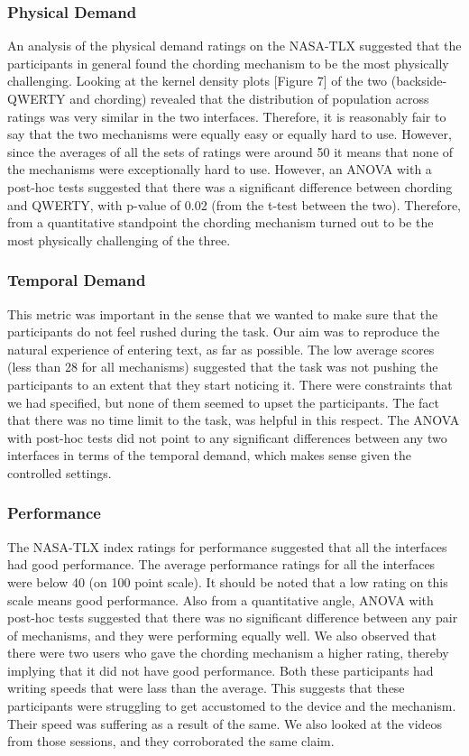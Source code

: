 \subsubsection{Physical Demand}

An analysis of the physical demand ratings on the NASA-TLX suggested
that the participants in general found the chording mechanism to be the most
physically challenging. Looking at the kernel
density plots [Figure 7] of the two (backside-QWERTY and chording) revealed that the distribution of population
across ratings was very similar in the two interfaces. Therefore, it is reasonably
fair to say that the two mechanisms were equally easy or equally hard
to use. However, since the averages of all the sets of ratings were
around 50 it means that none of the mechanisms were exceptionally hard to use. However, an ANOVA with a post-hoc tests suggested that there was a significant difference between chording and QWERTY, with p-value of 0.02 (from the t-test between the two). Therefore, from a quantitative standpoint the chording mechanism turned out to be the most physically challenging of the three.

\subsubsection{Temporal Demand}

This metric was important in the sense that we wanted to make sure
that the participants do not feel rushed during the task. Our aim was
to reproduce the natural experience of entering text, as far as
possible. The low average scores (less than 28 for all mechanisms)
suggested that the task was not pushing the participants to an extent
that they start noticing it. There were constraints that we had
specified, but none of them seemed to upset the participants. The fact
that there was no time limit to the task, was helpful in this respect. The ANOVA with post-hoc tests did not point to any significant differences between any two interfaces in terms of the temporal demand, which makes sense given the controlled settings.

\subsubsection{Performance}

The NASA-TLX index ratings for performance suggested that all the
interfaces had good performance. The average performance ratings for
all the interfaces were below 40 (on 100 point scale). It should be
noted that a low rating on this scale means good performance. Also from a quantitative angle, ANOVA with post-hoc tests suggested that there was no significant difference between any pair of mechanisms, and they were performing equally well. We also
observed that there were two users who gave the chording mechanism a
higher rating, thereby implying that it did not have good
performance. Both these participants had writing speeds that were lass
than the average. This suggests that these participants were
struggling to get accustomed to the device and the mechanism. Their
speed was suffering as a result of the same. We also looked at the
videos from those sessions, and they corroborated the same claim. 

